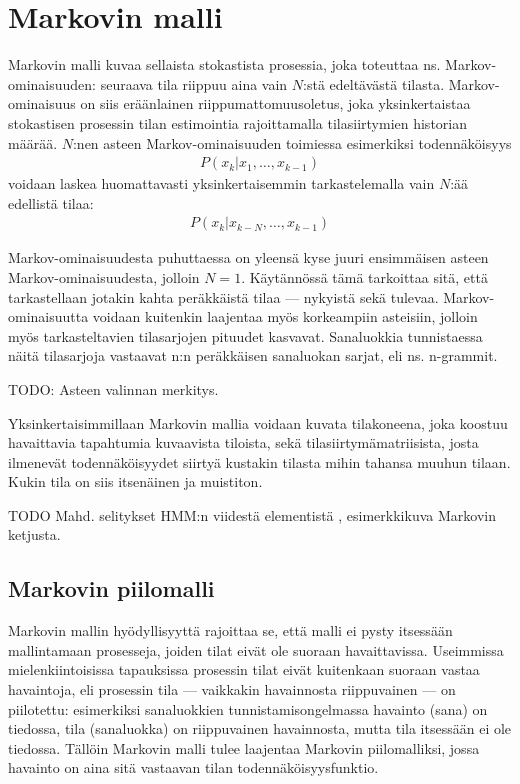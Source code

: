 \documentclass[utf8,bachelor,manualbib]{gradu3}
\begin{document}
\section{Markovin malli}

Markovin malli \citep[mm.][]{rabiner1989} kuvaa sellaista stokastista prosessia, joka toteuttaa ns. Markov-ominaisuuden: seuraava tila riippuu aina vain $N$:stä edeltävästä tilasta. Markov-ominaisuus on siis eräänlainen riippumattomuusoletus, joka yksinkertaistaa stokastisen prosessin tilan estimointia rajoittamalla tilasiirtymien historian määrää. $N$:nen asteen Markov-ominaisuuden toimiessa esimerkiksi todennäköisyys
\begin{align}
P(x_k | x_1, \ldots, x_{k-1})
\end{align}
voidaan laskea huomattavasti yksinkertaisemmin tarkastelemalla vain $N$:ää edellistä tilaa:
\begin{align}
P(x_k | x_{k - N }, \ldots, x_{k-1})
\end{align}

Markov-ominaisuudesta puhuttaessa on yleensä kyse juuri ensimmäisen asteen Markov-ominaisuudesta, jolloin $N=1$. Käytännössä tämä tarkoittaa sitä, että tarkastellaan jotakin kahta peräkkäistä tilaa --- nykyistä sekä tulevaa. Markov-ominaisuutta voidaan kuitenkin laajentaa myös korkeampiin asteisiin, jolloin myös tarkasteltavien tilasarjojen pituudet kasvavat. Sanaluokkia tunnistaessa näitä tilasarjoja vastaavat n:n peräkkäisen sanaluokan sarjat, eli ns. n-grammit.   

TODO: Asteen valinnan merkitys.

Yksinkertaisimmillaan Markovin mallia voidaan kuvata tilakoneena, joka koostuu havaittavia tapahtumia kuvaavista tiloista, sekä tilasiirtymämatriisista, josta ilmenevät todennäköisyydet siirtyä kustakin tilasta mihin tahansa muuhun tilaan. Kukin tila on siis itsenäinen ja muistiton.

TODO Mahd. selitykset HMM:n viidestä elementistä \citep{rabiner1989}, esimerkkikuva Markovin ketjusta.


\subsection{Markovin piilomalli}

Markovin mallin hyödyllisyyttä rajoittaa se, että malli ei pysty itsessään mallintamaan prosesseja, joiden tilat eivät ole suoraan havaittavissa. Useimmissa mielenkiintoisissa tapauksissa prosessin tilat eivät kuitenkaan suoraan vastaa havaintoja, eli prosessin tila --- vaikkakin havainnosta riippuvainen --- on piilotettu: esimerkiksi sanaluokkien tunnistamisongelmassa havainto (sana) on tiedossa, tila (sanaluokka) on riippuvainen havainnosta, mutta tila itsessään ei ole tiedossa. Tällöin Markovin malli tulee laajentaa Markovin piilomalliksi, jossa havainto on aina sitä vastaavan tilan todennäköisyysfunktio.
\end{document}
